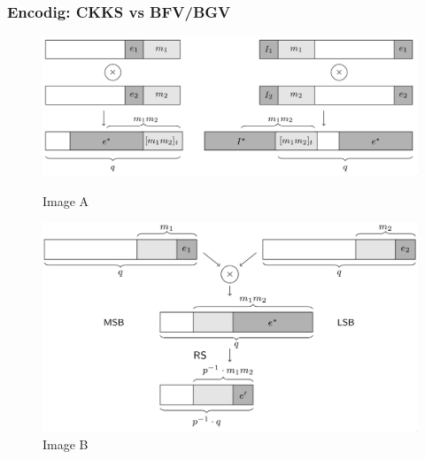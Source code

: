 \documentclass[10pt,handout]{beamer}
\begin{document}
\begin{frame}
    \frametitle{Encodig: CKKS vs BFV/BGV}
    \begin{figure}
        \begin{minipage}[c]{0.49\linewidth}
            \includegraphics[width=\linewidth]{encoding.png}
            \caption{Image A}
        \end{minipage}
        \hfill
        \begin{minipage}[c]{0.49\linewidth}
            \includegraphics[width=\linewidth]{encoding-ckks.png}
            \caption{Image B}
        \end{minipage}%
    \end{figure}
\end{frame}
\end{document}
